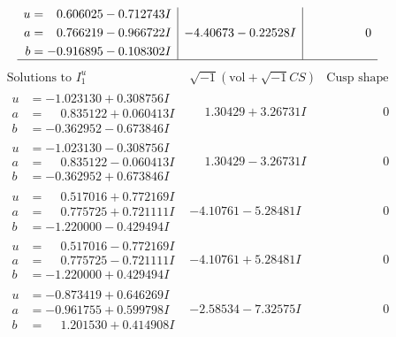 \documentclass[1p]{elsarticle_modified}
\theoremstyle{definition}
\newcommand{\I}{\sqrt{-1}}
\begin{document}
$$\begin{array}{c|c|c}
\begin{aligned}
u &= \phantom{-}0.606025 - 0.712743 I \\
a &= \phantom{-}0.766219 - 0.966722 I \\
b &= -0.916895 - 0.108302 I\end{aligned}
 & -4.40673 - 0.22528 I & \phantom{-0.000000 } 0\\
 \hline 
 \end{array}$$\newpage$$\begin{array}{c|c|c}  
\text{Solutions to }I^u_{1}& \I (\text{vol} + \sqrt{-1}CS) & \text{Cusp shape}\\
 \hline 
\begin{aligned}
u &= -1.023130 + 0.308756 I \\
a &= \phantom{-}0.835122 + 0.060413 I \\
b &= -0.362952 - 0.673846 I\end{aligned}
 & \phantom{-}1.30429 + 3.26731 I & \phantom{-0.000000 } 0 \\ \hline\begin{aligned}
u &= -1.023130 - 0.308756 I \\
a &= \phantom{-}0.835122 - 0.060413 I \\
b &= -0.362952 + 0.673846 I\end{aligned}
 & \phantom{-}1.30429 - 3.26731 I & \phantom{-0.000000 } 0 \\ \hline\begin{aligned}
u &= \phantom{-}0.517016 + 0.772169 I \\
a &= \phantom{-}0.775725 + 0.721111 I \\
b &= -1.220000 - 0.429494 I\end{aligned}
 & -4.10761 - 5.28481 I & \phantom{-0.000000 } 0 \\ \hline\begin{aligned}
u &= \phantom{-}0.517016 - 0.772169 I \\
a &= \phantom{-}0.775725 - 0.721111 I \\
b &= -1.220000 + 0.429494 I\end{aligned}
 & -4.10761 + 5.28481 I & \phantom{-0.000000 } 0 \\ \hline\begin{aligned}
u &= -0.873419 + 0.646269 I \\
a &= -0.961755 + 0.599798 I \\
b &= \phantom{-}1.201530 + 0.414908 I\end{aligned}
 & -2.58534 - 7.32575 I & \phantom{-0.000000 } 0 \\ \hline\begin{aligned}

\end{aligned}
\end{array}$$
\end{document}

